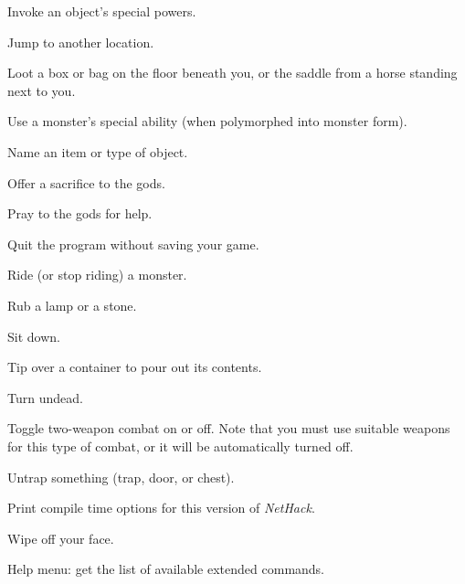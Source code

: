 Invoke an object's special powers.
\item[\tb{\#jump}]
Jump to another location.
\item[\tb{\#loot}]
Loot a box or bag on the floor beneath you, or the saddle 
from a horse standing next to you.
\item[\tb{\#monster}]
Use a monster's special ability (when polymorphed into monster form).
\item[\tb{\#name}]
Name an item or type of object.
\item[\tb{\#offer}]
Offer a sacrifice to the gods.
\item[\tb{\#pray}]
Pray to the gods for help.
\item[\tb{\#quit}]
Quit the program without saving your game.
\item[\tb{\#ride}]
Ride (or stop riding) a monster.
\item[\tb{\#rub}]
Rub a lamp or a stone.
\item[\tb{\#sit}]
Sit down.
\item[\tb{\#tip}]
Tip over a container to pour out its contents.
\item[\tb{\#turn}]
Turn undead.
\item[\tb{\#twoweapon}]
Toggle two-weapon combat on or off.  Note that you must
use suitable weapons for this type of combat, or it will
be automatically turned off.
\item[\tb{\#untrap}]
Untrap something (trap, door, or chest).
\item[\tb{\#version}]
Print compile time options for this version of {\it NetHack}.
\item[\tb{\#wipe}]
Wipe off your face.
\item[\tb{\#?}]
Help menu:  get the list of available extended commands.
\elist

